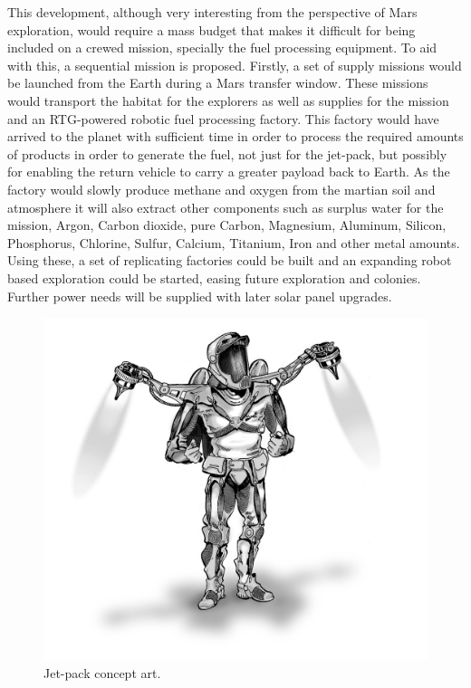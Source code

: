 \documentclass[twocolumn]{article}
\begin{document}
This development, although very interesting from the perspective of Mars 
exploration, would require a mass budget that makes it difficult for being 
included on a crewed mission, specially the fuel processing equipment. To aid 
with this, a sequential mission is proposed. Firstly, a set of supply missions 
would be launched from the Earth during a Mars transfer window. These missions 
would transport the habitat for the explorers as well as supplies for the 
mission and an RTG-powered robotic fuel processing factory. This factory would 
have arrived to the planet with sufficient time in order to process the 
required amounts of products in order to generate the fuel, not just for the 
jet-pack, but possibly for enabling the return vehicle to carry a greater 
payload back to Earth.
As the factory would slowly produce methane and oxygen from the martian soil 
and atmosphere it will also extract other components such as surplus water for 
the mission, Argon, Carbon dioxide, pure Carbon, Magnesium, Aluminum, Silicon, 
Phosphorus, Chlorine, Sulfur, Calcium, Titanium, Iron and other metal amounts. 
Using these, a set of replicating factories could be built and an expanding 
robot based exploration could be started, easing future exploration and 
colonies. Further power needs will be supplied with later solar panel upgrades.

\begin{figure}
  \centering
    \includegraphics[width=\textwidth]{img/frontal_v2.jpg}
  \caption{Jet-pack concept art.}
    \label{fig:concept_art}
\end{figure}
\end{document}
